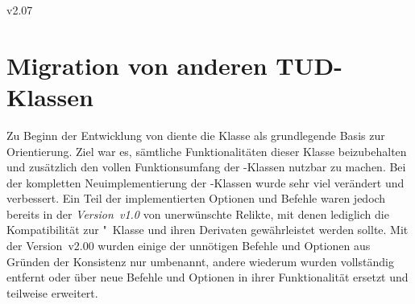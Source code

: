 \begin{Changes}{v2.07}
%
\end{Changes}


\section[%
  Das Paket \Package{tudscrcomp} -- Migration von anderen TUD-Klassen%
]{%
  Migration von anderen TUD-Klassen%
}
%
\begin{DeclareEntity}{}
\noindent{}

\bigskip\noindent
Zu Beginn der Entwicklung von \TUDScript diente die Klasse  als 
grundlegende Basis zur Orientierung. Ziel war es, sämtliche Funktionalitäten 
dieser Klasse beizubehalten und zusätzlich den vollen Funktionsumfang der 
\KOMAScript-Klassen nutzbar zu machen. Bei der kompletten Neuimplementierung 
der \TUDScript-Klassen wurde sehr viel verändert und verbessert. Ein Teil der 
implementierten Optionen und Befehle waren jedoch bereits in der 
\emph{Version~v1.0} von \TUDScript unerwünschte Relikte, mit denen lediglich 
die Kompatibilität zur "~Klasse und ihren Derivaten 
gewährleistet werden sollte. Mit der Version~v2.00 wurden einige der unnötigen 
Befehle und Optionen aus Gründen der Konsistenz nur umbenannt, andere wiederum 
wurden vollständig entfernt oder über neue Befehle und Optionen in ihrer 
Funktionalität ersetzt und teilweise erweitert. 


\end{DeclareEntity}

